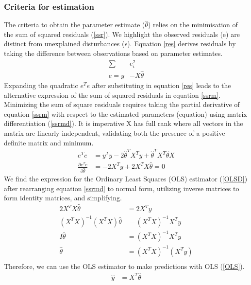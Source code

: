 \documentclass[10pt]{article}
\begin{document}
\subsubsection{Criteria for estimation}
The criteria to obtain the parameter estimate ($\hat{\theta}$) relies on the minimisation of the sum of squared residuals (\ref{ssr}).
We highlight the observed residuals (e) are distinct from unexplained disturbances ($\epsilon$).
Equation \ref{res} derives residuals by taking the difference between observations based on parameter estimates.
\begin{align}
	\sum & e_i^2  \label{ssr}\\
	e = y & - X \hat{\theta} \label{res}
\end{align}
Expanding the quadratic $e^{T}e$ after substituting in equation \ref{res} leads to the alternative expression of the sum of squared residuals in equation \ref{ssrm}.
Minimizing the sum of square residuals requires taking the partial derivative of equation \ref{ssrm} with respect to the estimated parameters (equation) using matrix differentiation (\ref{ssrmd}).
It is imperative X has full rank where all vectors in the matrix are linearly independent, validating both the presence of a positive definite matrix and minimum.
\begin{align}
	e^{T}e &= y^{T}y - 2\hat{\theta}^{T}X^{T}y + \hat{\theta}^{T}X^{T}\hat{\theta}X \label{ssrm}\\
	\frac{\partial e^{T}e}{\partial \hat{\theta}} &= - 2X^{T}y + 2X^{T}X\hat{\theta} =0 \label{ssrmd}
\end{align}
We find the expression for the Ordinary Least Squares (OLS) estimator (\ref{OLSD}) after rearranging equation \ref{ssrmd} to normal form, utilizing inverse matrices to form identity matrices, and simplifying.
\begin{align}
	2X^{T}X\hat{\theta} &= 2X^{T}y \\
	(X^{T}X)^{-1}(X^{T}X)\hat{\theta} &= (X^{T}X)^{-1}X^{T}y \\
	I\hat{\theta} &= (X^{T}X)^{-1}X^{T}y \\
	\hat{\theta} &= (X^{T}X)^{-1}(X^{T}y) \label{OLSD}\\
\end{align}
Therefore, we can use the OLS estimator to make predictions with OLS (\ref{OLS}).
\begin{align*}
	\hat{y} &= X^{T} \hat{\theta} \label{OLS}
\end{align*}
\end{document}

